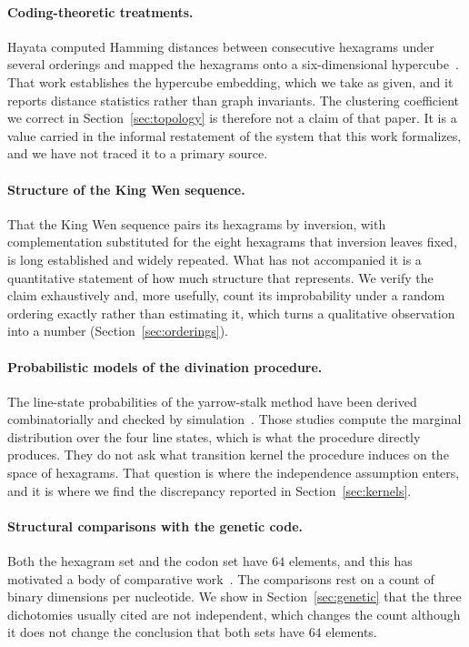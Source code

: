 \documentclass[11pt,a4paper]{article}
\begin{document}
\paragraph{Coding-theoretic treatments.}
Hayata computed Hamming distances between consecutive hexagrams under several
orderings and mapped the hexagrams onto a six-dimensional
hypercube~\cite{hayata2012coding}. That work establishes the hypercube
embedding, which we take as given, and it reports distance statistics rather
than graph invariants. The clustering coefficient we correct in
Section~\ref{sec:topology} is therefore not a claim of that paper. It is a value
carried in the informal restatement of the system that this work formalizes, and
we have not traced it to a primary source.

\paragraph{Structure of the King Wen sequence.}
That the King Wen sequence pairs its hexagrams by inversion, with complementation
substituted for the eight hexagrams that inversion leaves fixed, is long
established and widely repeated. What has not accompanied it is a quantitative
statement of how much structure that represents. We verify the claim
exhaustively and, more usefully, count its improbability under a random ordering
exactly rather than estimating it, which turns a qualitative observation into a
number (Section~\ref{sec:orderings}).

\paragraph{Probabilistic models of the divination procedure.}
The line-state probabilities of the yarrow-stalk method have been derived
combinatorially and checked by
simulation~\cite{sun2018dayan,tang2017monte}. Those studies compute the
marginal distribution over the four line states, which is what the procedure
directly produces. They do not ask what transition kernel the procedure induces
on the space of hexagrams. That question is where the independence assumption
enters, and it is where we find the discrepancy reported in
Section~\ref{sec:kernels}.

\paragraph{Structural comparisons with the genetic code.}
Both the hexagram set and the codon set have $64$ elements, and this has
motivated a body of comparative
work~\cite{hu2017iching,castrochavez2012defragged,lien1997physicochemical}. The
comparisons rest on a count of binary dimensions per nucleotide. We show in
Section~\ref{sec:genetic} that the three dichotomies usually cited are not
independent, which changes the count although it does not change the conclusion
that both sets have $64$ elements.
\end{document}
